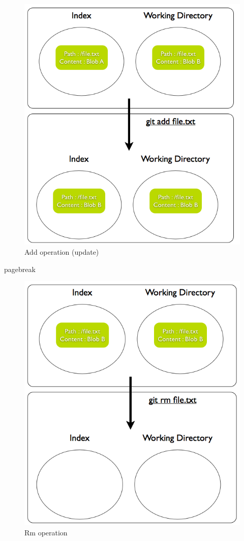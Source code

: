\begin{figure}[h] 
	\caption{Add operation (update)}
	\centering
	\includegraphics[scale=0.40]{images/add2.png}
\end{figure}

pagebreak
\pagebreak 

\begin{figure}[h] 
	\caption{Rm operation}
	\centering
	\includegraphics[scale=0.40]{images/rm1.png}
\end{figure}

